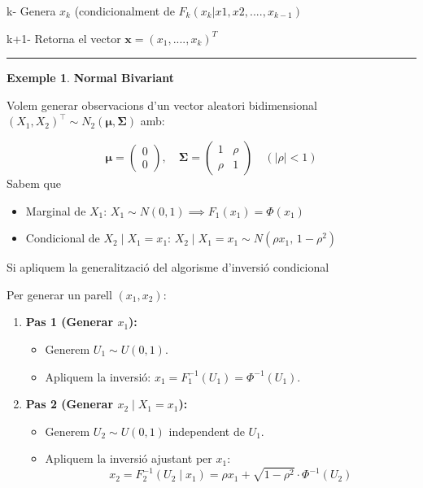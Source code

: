 \documentclass[
  catalan,
]{article}
\providecommand{\tightlist}{%
  \setlength{\itemsep}{0pt}\setlength{\parskip}{0pt}}
\theoremstyle{definition}
\theoremstyle{definition}
\newtheorem{example}{Exemple}[section]
\theoremstyle{definition}
\theoremstyle{definition}
\theoremstyle{remark}
\begin{document}
k- Genera \(x_k\) (condicionalment de \(F_k(x_k |x1,x2,....,x_{k-1})\)

k+1- Retorna el vector \(\mathbf{x}=(x_1,....,x_k)^T\)

\begin{center}\rule{0.5\linewidth}{0.5pt}\end{center}

\begin{example}
\protect\hypertarget{exm:simnormbiv}{}\label{exm:simnormbiv}\textbf{Normal Bivariant}

Volem generar observacions d'un vector aleatori bidimensional \((X_1, X_2)^\top \sim N_2(\boldsymbol{\mu}, \mathbf{\Sigma})\) amb:

\[
\boldsymbol{\mu} = \begin{pmatrix} 0 \\ 0 \end{pmatrix}, \quad \mathbf{\Sigma} = \begin{pmatrix} 1 & \rho \\ \rho & 1 \end{pmatrix} \quad (|\rho| < 1)
\]
Sabem que

\begin{itemize}
\tightlist
\item
  Marginal de \(X_1\): \(X_1 \sim N(0, 1) \implies F_1(x_1) = \Phi(x_1)\)
\item
  Condicional de \(X_2 \mid X_1 = x_1\): \(X_2 \mid X_1 = x_1 \sim N\left(\rho x_1, \, 1 - \rho^2\right)\)
\end{itemize}

Si apliquem la generalització del algorisme d'inversió condicional

Per generar un parell \((x_1, x_2)\):

\begin{enumerate}
\def\labelenumi{\arabic{enumi}.}
\tightlist
\item
  \textbf{Pas 1 (Generar \(x_1\)):}

  \begin{itemize}
  \tightlist
  \item
    Generem \(U_1 \sim U(0,1)\).
  \item
    Apliquem la inversió: \(x_1 = F_1^{-1}(U_1) = \Phi^{-1}(U_1)\).
  \end{itemize}
\item
  \textbf{Pas 2 (Generar \(x_2 \mid X_1 = x_1\)):}

  \begin{itemize}
  \tightlist
  \item
    Generem \(U_2 \sim U(0,1)\) independent de \(U_1\).
  \item
    Apliquem la inversió ajustant per \(x_1\):
    \[x_2 = F_2^{-1}(U_2 \mid x_1) = \rho x_1 + \sqrt{1 - \rho^2} \cdot \Phi^{-1}(U_2)\]
  \end{itemize}
\end{enumerate}


\end{example}
\end{document}
